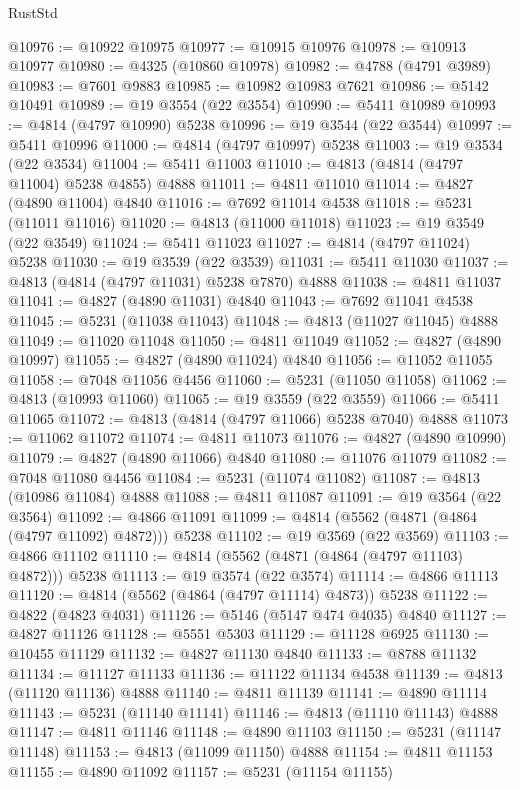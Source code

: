 \begin{lexlean}{RustStd}
\begin{coremodule}
@10976 := @10922 @10975
@10977 := @10915 @10976
@10978 := @10913 @10977
@10980 := @4325 (@10860 @10978)
@10982 := @4788 (@4791 @3989)
@10983 := @7601 @9883
@10985 := @10982 @10983 @7621
@10986 := @5142 @10491
@10989 := @19 @3554 (@22 @3554)
@10990 := @5411 @10989
@10993 := @4814 (@4797 @10990) @5238
@10996 := @19 @3544 (@22 @3544)
@10997 := @5411 @10996
@11000 := @4814 (@4797 @10997) @5238
@11003 := @19 @3534 (@22 @3534)
@11004 := @5411 @11003
@11010 := @4813 (@4814 (@4797 @11004) @5238 @4855) @4888
@11011 := @4811 @11010
@11014 := @4827 (@4890 @11004) @4840
@11016 := @7692 @11014 @4538
@11018 := @5231 (@11011 @11016)
@11020 := @4813 (@11000 @11018)
@11023 := @19 @3549 (@22 @3549)
@11024 := @5411 @11023
@11027 := @4814 (@4797 @11024) @5238
@11030 := @19 @3539 (@22 @3539)
@11031 := @5411 @11030
@11037 := @4813 (@4814 (@4797 @11031) @5238 @7870) @4888
@11038 := @4811 @11037
@11041 := @4827 (@4890 @11031) @4840
@11043 := @7692 @11041 @4538
@11045 := @5231 (@11038 @11043)
@11048 := @4813 (@11027 @11045) @4888
@11049 := @11020 @11048
@11050 := @4811 @11049
@11052 := @4827 (@4890 @10997)
@11055 := @4827 (@4890 @11024) @4840
@11056 := @11052 @11055
@11058 := @7048 @11056 @4456
@11060 := @5231 (@11050 @11058)
@11062 := @4813 (@10993 @11060)
@11065 := @19 @3559 (@22 @3559)
@11066 := @5411 @11065
@11072 := @4813 (@4814 (@4797 @11066) @5238 @7040) @4888
@11073 := @11062 @11072
@11074 := @4811 @11073
@11076 := @4827 (@4890 @10990)
@11079 := @4827 (@4890 @11066) @4840
@11080 := @11076 @11079
@11082 := @7048 @11080 @4456
@11084 := @5231 (@11074 @11082)
@11087 := @4813 (@10986 @11084) @4888
@11088 := @4811 @11087
@11091 := @19 @3564 (@22 @3564)
@11092 := @4866 @11091
@11099 := @4814 (@5562 (@4871 (@4864 (@4797 @11092) @4872))) @5238
@11102 := @19 @3569 (@22 @3569)
@11103 := @4866 @11102
@11110 := @4814 (@5562 (@4871 (@4864 (@4797 @11103) @4872))) @5238
@11113 := @19 @3574 (@22 @3574)
@11114 := @4866 @11113
@11120 := @4814 (@5562 (@4864 (@4797 @11114) @4873)) @5238
@11122 := @4822 (@4823 @4031)
@11126 := @5146 (@5147 @474 @4035) @4840
@11127 := @4827 @11126
@11128 := @5551 @5303
@11129 := @11128 @6925
@11130 := @10455 @11129
@11132 := @4827 @11130 @4840
@11133 := @8788 @11132
@11134 := @11127 @11133
@11136 := @11122 @11134 @4538
@11139 := @4813 (@11120 @11136) @4888
@11140 := @4811 @11139
@11141 := @4890 @11114
@11143 := @5231 (@11140 @11141)
@11146 := @4813 (@11110 @11143) @4888
@11147 := @4811 @11146
@11148 := @4890 @11103
@11150 := @5231 (@11147 @11148)
@11153 := @4813 (@11099 @11150) @4888
@11154 := @4811 @11153
@11155 := @4890 @11092
@11157 := @5231 (@11154 @11155)

\end{coremodule}
\end{lexlean}
